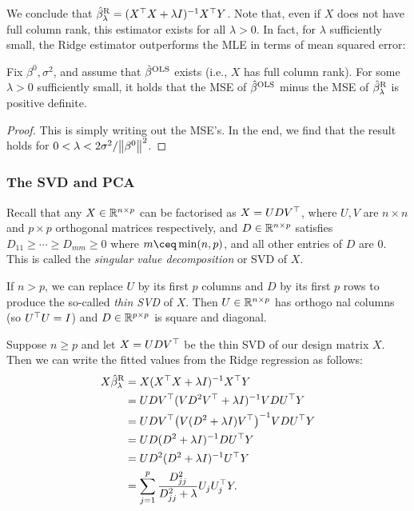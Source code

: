 We conclude that $\hat\beta^\mathrm{R}_\lambda = (X^\top X + \lambda I)^{-1} X^\top Y$. Note that, even if $X$ does not have full column rank, this estimator exists for all $\lambda > 0$.  In fact, for $\lambda$ sufficiently small, the Ridge estimator outperforms the MLE in terms of mean squared error:
\begin{theorem}
    Fix $\beta^0, \sigma^2$, and assume that $\hat\beta^\mathrm{OLS}$ exists (i.e., $X$ has full column rank). For some $\lambda > 0$ sufficiently small, it holds that the MSE of $\hat\beta^\mathrm{OLS}$ minus the MSE of $\hat\beta^\mathrm{R}_\lambda$ is positive definite. 
\end{theorem}

\begin{proof}
    This is simply writing out the MSE's. In the end, we find that the result holds for $0 < \lambda < 2\sigma^2 / \norm{\beta^0}^2$. 
\end{proof}

\subsubsection{The SVD and PCA}
\begin{recap}
    Recall that any $X \in \mathbb R^{n \times p}$ can be factorised as $X = UDV^\top$, where $U, V$ are $n \times n$ and $p \times p$ orthogonal matrices respectively, and $D \in \mathbb R^{n \times p}$ satisfies $D_{11} \geq\dotsb\geq D_{mm} \geq 0$ where $m \ceq \min(n, p)$, and all other entries of $D$ are 0. This is called the \emph{singular value decomposition} or SVD of $X$. 
    
    If $n > p$, we can replace $U$ by its first $p$ columns and $D$ by its first $p$ rows to produce the so-called \emph{thin SVD} of $X$. Then $U \in \mathbb R^{n \times p}$ has orthogo nal columns (so $U^\top U = I$) and $D \in \mathbb R^{p \times p}$ is square and diagonal. 
\end{recap}

Suppose $n \geq p$ and let $X = UDV^\top$ be the thin SVD of our design matrix $X$. Then we can write the fitted values from the Ridge regression as follows: 
\begin{align*}
    X\hat\beta_\lambda^\mathrm{R} &= X(X^\top X + \lambda I)^{-1} X^\top Y \\
    &= UDV^\top (VD^2V^\top + \lambda I)^{-1} VDU^\top Y \\
    &= UDV^\top \qty(V(D^2 + \lambda I)V^\top)^{-1} VDU^\top Y \\
    &= UD (D^2 + \lambda I)^{-1} DU^\top Y \\
    &= U D^2 (D^2 + \lambda I)^{-1} U^\top Y \\
    &= \sum_{j=1}^p \frac{D_{jj}^2}{D_{jj}^2 + \lambda} U_j U_j^\top Y. 
\end{align*}

